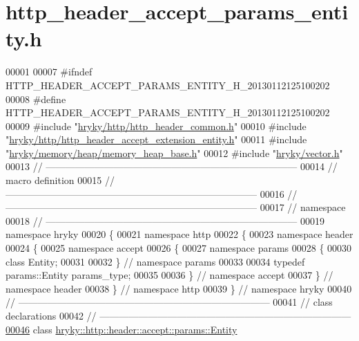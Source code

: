 \hypertarget{http__header__accept__params__entity_8h_source}{\section{http\-\_\-header\-\_\-accept\-\_\-params\-\_\-entity.\-h}
}

\begin{DoxyCode}
00001 
00007 \textcolor{preprocessor}{#ifndef HTTP\_HEADER\_ACCEPT\_PARAMS\_ENTITY\_H\_20130112125100202}
00008 \textcolor{preprocessor}{}\textcolor{preprocessor}{#define HTTP\_HEADER\_ACCEPT\_PARAMS\_ENTITY\_H\_20130112125100202}
00009 \textcolor{preprocessor}{}\textcolor{preprocessor}{#include "\hyperlink{http__header__common_8h}{hryky/http/http_header_common.h}"}
00010 \textcolor{preprocessor}{#include "\hyperlink{http__header__accept__extension__entity_8h}{hryky/http/http_header_accept_extension_entity.h}"}
00011 \textcolor{preprocessor}{#include "\hyperlink{memory__heap__base_8h}{hryky/memory/heap/memory_heap_base.h}"}
00012 \textcolor{preprocessor}{#include "\hyperlink{vector_8h}{hryky/vector.h}"}
00013 \textcolor{comment}{//
      ------------------------------------------------------------------------------}
00014 \textcolor{comment}{// macro definition}
00015 \textcolor{comment}{//
      ------------------------------------------------------------------------------}
00016 \textcolor{comment}{//
      ------------------------------------------------------------------------------}
00017 \textcolor{comment}{// namespace}
00018 \textcolor{comment}{//
      ------------------------------------------------------------------------------}
00019 \textcolor{keyword}{namespace }hryky
00020 \{
00021 \textcolor{keyword}{namespace }http
00022 \{
00023 \textcolor{keyword}{namespace }header
00024 \{
00025 \textcolor{keyword}{namespace }accept
00026 \{
00027 \textcolor{keyword}{namespace }params
00028 \{
00030     \textcolor{keyword}{class }Entity;
00031 
00032 \} \textcolor{comment}{// namespace params}
00033 
00034 \textcolor{keyword}{typedef} params::Entity params\_type;
00035 
00036 \} \textcolor{comment}{// namespace accept}
00037 \} \textcolor{comment}{// namespace header}
00038 \} \textcolor{comment}{// namespace http}
00039 \} \textcolor{comment}{// namespace hryky}
00040 \textcolor{comment}{//
      ------------------------------------------------------------------------------}
00041 \textcolor{comment}{// class declarations}
00042 \textcolor{comment}{//
      ------------------------------------------------------------------------------}
\hypertarget{http__header__accept__params__entity_8h_source_l00046}{}\hyperlink{classhryky_1_1http_1_1header_1_1accept_1_1params_1_1_entity}{00046} \textcolor{comment}{}\textcolor{keyword}{class }\hyperlink{classhryky_1_1http_1_1header_1_1accept_1_1params_1_1_entity}{hryky::http::header::accept::params::Entity}

\end{DoxyCode}
